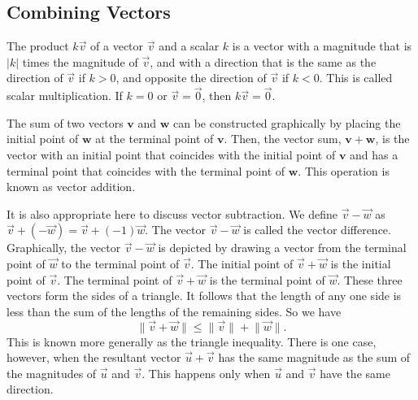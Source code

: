 \documentclass{report}
\begin{document}
    \pagebreak \bigbreak \noindent 
    \subsection{Combining Vectors}
    \bigbreak \noindent 
    \begin{dfn}[Scalars]
        The product $k\vec{v}$ of a vector $\vec{v}$ and a scalar $k$ is a vector with a magnitude that is $|k|$ times the magnitude of $\vec{v}$, and with a direction that is the same as the direction of $\vec{v}$ if $k > 0$, and opposite the direction of $\vec{v}$ if $k < 0$. This is called scalar multiplication. If $k = 0$ or $\vec{v} = \vec{0}$, then $k\vec{v} = \vec{0}$.
    \end{dfn}
    \bigbreak \noindent 
    \begin{dfn}
        The sum of two vectors $\mathbf{v}$ and $\mathbf{w}$ can be constructed graphically by placing the initial point of $\mathbf{w}$ at the terminal point of $\mathbf{v}$. Then, the vector sum, $\mathbf{v} + \mathbf{w}$, is the vector with an initial point that coincides with the initial point of $\mathbf{v}$ and has a terminal point that coincides with the terminal point of $\mathbf{w}$. This operation is known as vector addition.
        \bigbreak \noindent 
    \end{dfn}
    \bigbreak \noindent 
    It is also appropriate here to discuss vector subtraction. We define $\vec{v} - \vec{w}$ as $\vec{v} + (-\vec{w}) = \vec{v} + (-1)\vec{w}$. The vector $\vec{v} - \vec{w}$ is called the vector difference. Graphically, the vector $\vec{v} - \vec{w}$ is depicted by drawing a vector from the terminal point of $\vec{w}$ to the terminal point of $\vec{v}$.
    \bigbreak \noindent 
    \bigbreak \noindent 
    The initial point of $\vec{v} + \vec{w}$ is the initial point of $\vec{v}$. The terminal point of $\vec{v} + \vec{w}$ is the terminal point of $\vec{w}$. These three vectors form the sides of a triangle. It follows that the length of any one side is less than the sum of the lengths of the remaining sides. So we have
    \[
        \lVert \vec{v} + \vec{w} \rVert \leq \lVert \vec{v} \rVert + \lVert \vec{w} \rVert.
    \]
    This is known more generally as the triangle inequality. There is one case, however, when the resultant vector $\vec{u} + \vec{v}$ has the same magnitude as the sum of the magnitudes of $\vec{u}$ and $\vec{v}$. This happens only when $\vec{u}$ and $\vec{v}$ have the same direction.
    \bigbreak \noindent 
    \pagebreak 
\end{document}
